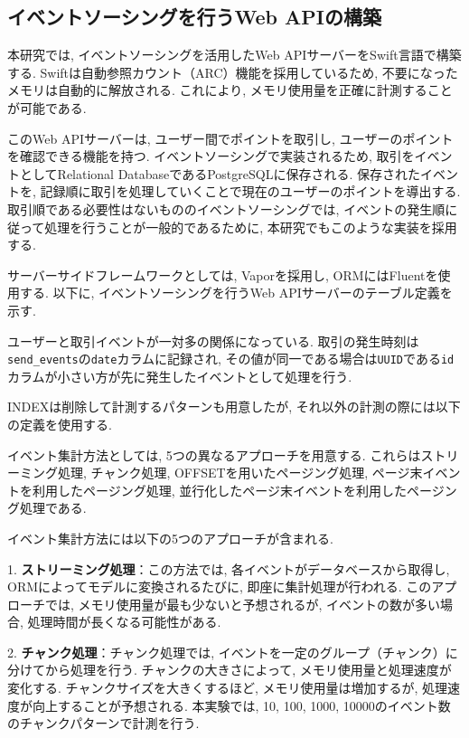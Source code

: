 \documentclass[../../../main]{subfiles}
\begin{document}
    \subsection{イベントソーシングを行うWeb APIの構築}\label{subsec:method-event_sourcing_api}

    本研究では, イベントソーシングを活用したWeb APIサーバーをSwift言語で構築する. Swiftは自動参照カウント（ARC）機能を採用しているため, 不要になったメモリは自動的に解放される. これにより, メモリ使用量を正確に計測することが可能である.

    このWeb APIサーバーは, ユーザー間でポイントを取引し, ユーザーのポイントを確認できる機能を持つ. イベントソーシングで実装されるため, 取引をイベントとしてRelational DatabaseであるPostgreSQLに保存される. 保存されたイベントを, 記録順に取引を処理していくことで現在のユーザーのポイントを導出する. 取引順である必要性はないもののイベントソーシングでは, イベントの発生順に従って処理を行うことが一般的であるために, 本研究でもこのような実装を採用する.

    サーバーサイドフレームワークとしては, Vaporを採用し, ORMにはFluentを使用する. 以下に, イベントソーシングを行うWeb APIサーバーのテーブル定義を示す.

    

    ユーザーと取引イベントが一対多の関係になっている. 取引の発生時刻は\texttt{send\_events}の\texttt{date}カラムに記録され, その値が同一である場合は\texttt{UUID}である\texttt{id}カラムが小さい方が先に発生したイベントとして処理を行う.

    INDEXは削除して計測するパターンも用意したが, それ以外の計測の際には以下の定義を使用する.

    

    イベント集計方法としては, 5つの異なるアプローチを用意する. これらはストリーミング処理, チャンク処理, OFFSETを用いたページング処理, ページ末イベントを利用したページング処理, 並行化したページ末イベントを利用したページング処理である.

    イベント集計方法には以下の5つのアプローチが含まれる.

    1. \textbf{ストリーミング処理}：この方法では, 各イベントがデータベースから取得し, ORMによってモデルに変換されるたびに, 即座に集計処理が行われる. このアプローチでは, メモリ使用量が最も少ないと予想されるが, イベントの数が多い場合, 処理時間が長くなる可能性がある.

    2. \textbf{チャンク処理}：チャンク処理では, イベントを一定のグループ（チャンク）に分けてから処理を行う. チャンクの大きさによって, メモリ使用量と処理速度が変化する. チャンクサイズを大きくするほど, メモリ使用量は増加するが, 処理速度が向上することが予想される. 本実験では, 10, 100, 1000, 10000のイベント数のチャンクパターンで計測を行う.
\end{document}
